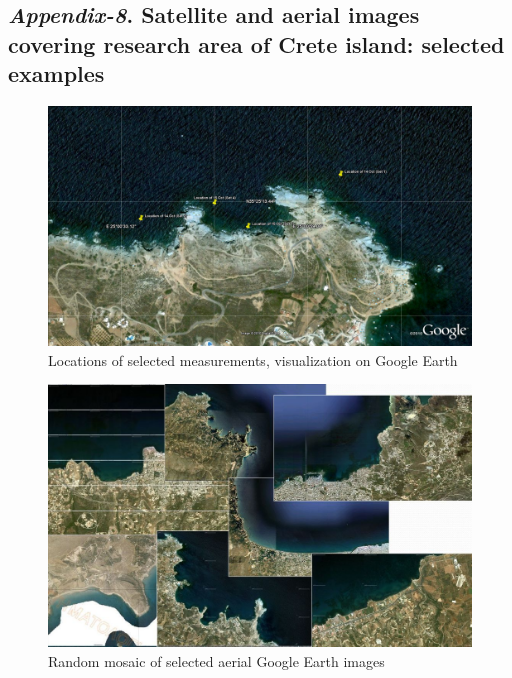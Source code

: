 \documentclass[11pt]{article}
\begin{document}
\begin{appendices}
\subsection{\textit{Appendix-8}. Satellite and aerial images covering research area of Crete island: selected examples}

\begin{figure}[H]
	\begin{center}
		\includegraphics[scale=0.20]{Locations_Meas.jpg}
		\caption{Locations of selected measurements, visualization on Google Earth­}\label{fig:A.36}
	\end{center}	
\end{figure}

\begin{figure}[H]
	\begin{center}
		\includegraphics[scale=0.25]{App-8.jpg}
		\caption{Random mosaic of selected aerial Google Earth images}\label{fig:A.37}	
	\end{center}	
\end{figure}
\pagebreak


\end{appendices}
\end{document}
